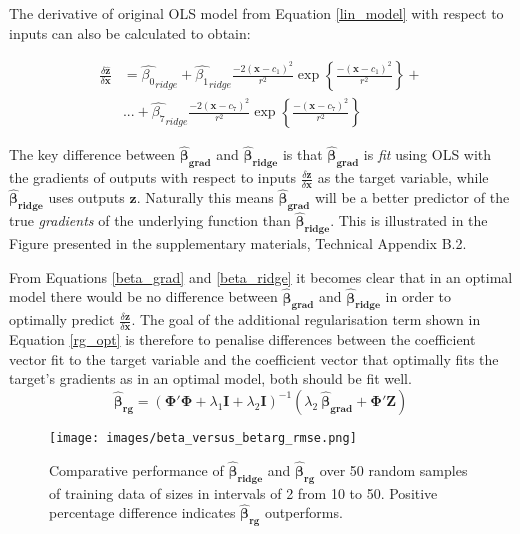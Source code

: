 \documentclass{article}
\begin{document}
The derivative of original OLS model from Equation \ref{lin_model} with respect to inputs can also be calculated to obtain:

\begin{equation}
	\label{beta_ridge}
	\begin{split}
		\frac{\delta \mathbf{\hat{z}}}{\delta \mathbf{x}} &= \hat{\beta_0}_{ridge} + \hat{\beta_1}_{ridge} \frac{-2(\mathbf{x} - c_1)^2}{r^2} \exp \left \{ \frac{-(\mathbf{x} - c_1)^2}{r^2} \right \} + \\
		&... + \hat{\beta_7}_{ridge} \frac{-2(\mathbf{x} - c_7)^2}{r^2} \exp \left \{ \frac{-(\mathbf{x} - c_7)^2}{r^2} \right \}
	\end{split}
\end{equation}

The key difference between $\boldsymbol{\hat{\beta}_{grad}}$ and $\boldsymbol{\hat{\beta}_{ridge}}$ is that $\boldsymbol{\hat{\beta}_{grad}}$ is \textit{fit} using OLS with the gradients of outputs with respect to inputs $\frac{\delta \mathbf{z}}{\delta \mathbf{x}}$ as the target variable, while $\boldsymbol{\hat{\beta}_{ridge}}$ uses outputs $\mathbf{z}$. Naturally this means $\boldsymbol{\hat{\beta}_{grad}}$ will be a better predictor of the true \textit{gradients} of the underlying function than $\boldsymbol{\hat{\beta}_{ridge}}$. This is illustrated in the Figure presented in the supplementary materials, Technical Appendix B.2.

From Equations \ref{beta_grad} and \ref{beta_ridge} it becomes clear that in an optimal model there would be no difference between  $\boldsymbol{\hat{\beta}_{grad}}$ and $\boldsymbol{\hat{\beta}_{ridge}}$ in order to optimally predict $\frac{\delta \mathbf{z}}{\delta \mathbf{x}}$. The goal of the additional regularisation term shown in Equation \ref{rg_opt} is therefore to penalise differences between the coefficient vector fit to the target variable and the coefficient vector that optimally fits the target's gradients as in an optimal model, both should be fit well.
\begin{equation}
\label{beta_rg}
\boldsymbol{\hat{\beta}_{rg}} = (\mathbf{\Phi}'\mathbf{\Phi} + \lambda_1 \mathbf{I} + \lambda_2 \mathbf{I})^{-1} (\lambda_2 \ \boldsymbol{\hat{\beta}_{grad}} + \mathbf{\Phi}'\mathbf{Z})
\end{equation}

\begin{figure}[!ht]
	\centering
	\texttt{[image: images/beta\_versus\_betarg\_rmse.png]}
	\caption{Comparative performance of $\boldsymbol{\hat{\beta}_{ridge}}$ and $\boldsymbol{\hat{\beta}_{rg}}$ over 50 random samples of training data of sizes in intervals of 2 from 10 to 50. Positive percentage difference indicates $\boldsymbol{\hat{\beta}_{rg}}$ outperforms.} 
	\label{beta_versus_betarg}
\vspace{-0.4cm}
\end{figure}
\end{document}
